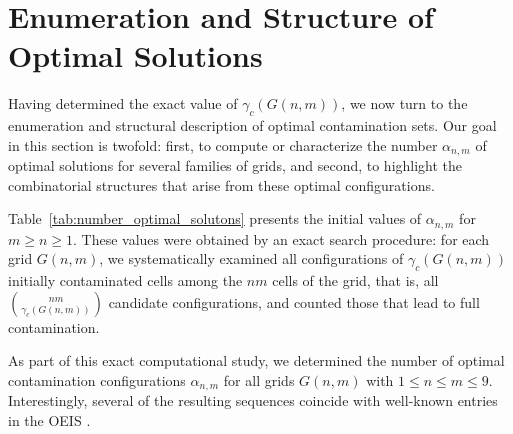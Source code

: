 \documentclass[letterpaper,12pt]{article}
\begin{document}
\section{Enumeration and Structure of Optimal Solutions}\label{sec:enumeration}

Having determined the exact value of \(\gamma_c(G(n,m))\), we now turn to the enumeration and structural description of optimal contamination sets. Our goal in this section is twofold: first, to compute or characterize the number \(\alpha_{n,m}\) of optimal solutions for several families of grids, and second, to highlight the combinatorial structures that arise from these optimal configurations.

 


Table~\ref{tab:number_optimal_solutons} presents the initial values of \(\alpha_{n,m}\) for
\(m \ge n \ge 1\). These values were obtained by an exact search procedure: for each grid
\(G(n,m)\), we systematically examined all configurations of
\(\gamma_c(G(n,m))\) initially contaminated cells among the \(nm\) cells of the grid, that is,
all \(\binom{nm}{\gamma_c(G(n,m))}\) candidate configurations, and counted those that lead to
full contamination.

As part of this exact computational study, we determined the number of optimal contamination
configurations \(\alpha_{n,m}\) for all grids \(G(n,m)\) with \(1 \le n \le m \le 9\). Interestingly,
several of the resulting sequences coincide with well-known entries in the OEIS \cite{OEIS}.
\end{document}
